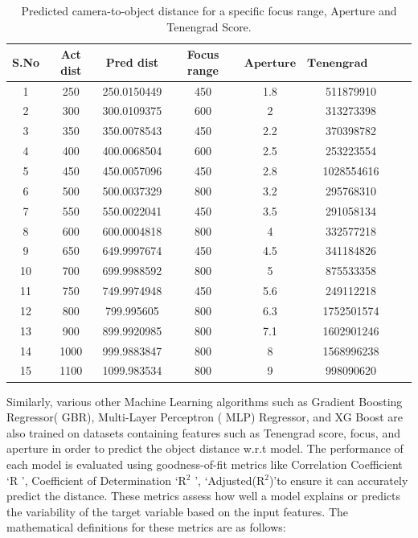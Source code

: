 \documentclass[sn-mathphys]{sn-jnl}%
\theoremstyle{thmstyleone}%
\theoremstyle{thmstyletwo}%
\theoremstyle{thmstylethree}%
\begin{document}
\begin{table}[ht]
\centering
\caption{Predicted camera-to-object distance for a specific focus range, ${\text{Aperture}}$ and Tenengrad Score.}
\label{tab:am9}
\begin{tabular}{|c|c|c|c|c|c|c|}
\hline
\textbf{S.No} & \textbf{Act dist} & \textbf{Pred dist} & \textbf{Focus range} & ${\textbf{Aperture}}$ & ${\textbf {Tenengrad Score}}$  \\ \hline
1 & 250 & 250.0150449
 & 450 & 1.8 &511879910
 \\ \hline
2 & 300 & 300.0109375



 & 600 & 2 & 313273398
 \\ \hline
3 & 350 & 350.0078543
 & 450 & 2.2 & 370398782
 \\ \hline
4 & 400 & 400.0068504
 & 600 & 2.5 & 253223554
 \\ \hline
5 & 450 & 450.0057096
 & 450 & 2.8 & 1028554616
 \\ \hline
6 & 500 &500.0037329
 & 800 & 3.2 &295768310
 \\ \hline
7 & 550 & 550.0022041
 & 450 & 3.5 & 291058134
\\ \hline
8 & 600 & 600.0004818
 & 800 & 4 & 332577218
 \\ \hline
9 & 650 & 649.9997674
 & 450 & 4.5 & 341184826
 \\ \hline
10 & 700 & 699.9988592
 & 800 & 5 & 875533358
 \\ \hline
11 & 750 & 749.9974948
 & 450 & 5.6 & 249112218
 \\ \hline
12 & 800 & 799.995605
 & 800 & 6.3 & 1752501574
\\ \hline
13 & 900 & 899.9920985
 & 800 & 7.1 & 1602901246
 \\ \hline
14 & 1000 & 999.9883847
 & 800 & 8 & 1568996238
 \\ \hline
15 & 1100 & 1099.983534
 & 800 & 9 & 998090620
 \\ \hline
\end{tabular}
\end{table}


Similarly, various other Machine Learning algorithms such as Gradient Boosting Regressor( GBR), Multi-Layer Perceptron ( MLP) Regressor, and XG Boost are also trained on datasets containing features such as Tenengrad score, focus, and aperture in order to predict the object distance w.r.t model. The performance of each model is evaluated using goodness-of-fit metrics like Correlation Coefficient \lq R \rq, Coefficient of Determination \lq R$^{2}$ \rq, \lq Adjusted(R$^{2}$)\rq to ensure it can accurately predict the distance. These metrics assess how well a model explains or predicts the variability of the target variable based on the input features. The mathematical definitions  for these metrics are as follows:
\end{document}
